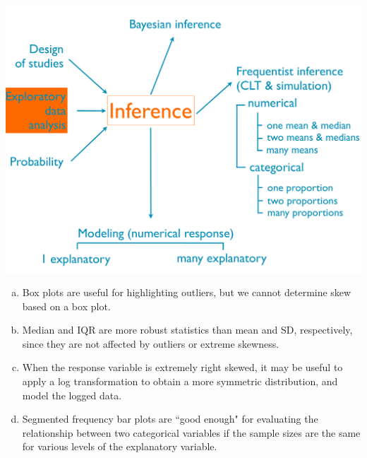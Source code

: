 \documentclass[11pt,containsverbatim,handout,xcolor=xelatex,dvipsnames,table]{beamer}
\newcommand{\solnMult}[1]{#1}
\begin{document}
\begin{frame}

{
{\scriptsize
{}}}
{
 \includegraphics[width=\textwidth]{figures/map/eda}
}

\vfill

{\footnotesize
\begin{enumerate}[(a)]
\item \solnMult{Box plots are useful for highlighting outliers, but we cannot determine skew based on a box plot.}
\item Median and IQR are more robust statistics than mean and SD, respectively, since they are not affected by outliers or extreme skewness.
\item When the response variable is extremely right skewed, it may be useful to apply a log transformation to obtain a more symmetric distribution, and model the logged data.
\item Segmented frequency bar plots are ``good enough" for evaluating the relationship between two categorical variables if the sample sizes are the same for various levels of the explanatory variable.
\end{enumerate}
}

\end{frame}

\end{document}
